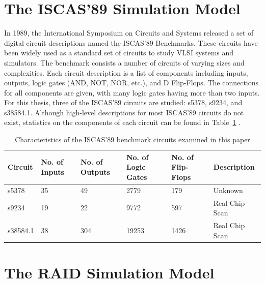 \documentclass[11pt]{book}
\begin{document}
\section{The ISCAS'89 Simulation Model}

In 1989, the International Symposium on Circuits and Systems released a set of digital circuit descriptions named the ISCAS'89 Benchmarks. These circuits have been widely used as a standard set of circuits to study VLSI systems and simulators. The benchmark consists a number of circuits of varying sizes and complexities. Each circuit description is a list of components including inputs, outputs, logic gates (AND, NOT, NOR, etc.), and D Flip-Flops. The connections for all components are given, with many logic gates having more than two inputs. For this thesis, three of the ISCAS'89 circuits are studied: s5378, s9234, and s38584.1. Although high-level descriptions for most ISCAS'89 circuits do not exist, statistics on the components of each circuit can be found in Table~\ref{tab:iscasStats} \cite{brglez-89}.

\begin{table}[h]
\centering
\begin{tabular}{@{}llllll@{}}
\toprule
Circuit  & No. of Inputs & No. of Outputs & No. of Logic Gates & No. of Flip-Flops & Description    \\ \midrule
s5378    & 35            & 49             & 2779               & 179               & Unknown        \\
s9234    & 19            & 22             & 9772               & 597               & Real Chip Scan \\
s38584.1 & 38            & 304            & 19253              & 1426              & Real Chip Scan \\ \bottomrule
\end{tabular}
\caption{Characteristics of the ISCAS'89 benchmark circuits examined in this paper}
\label{tab:iscasStats}
\end{table}


\section{The RAID Simulation Model}\label{raidDiscussion}
\end{document}
